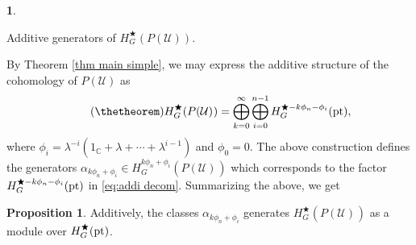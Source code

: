\documentclass[a4paper,leqno,11pt]{amsart}
\theoremstyle{plain}
\theoremstyle{definition}
\newtheorem{prop}[theorem]{Proposition}
\newtheorem{subsec}[theorem]{}
\theoremstyle{remark}
\theoremstyle{definition}
\newcommand{\C}{{\mathbb C}}
\newenvironment{myeq}[1][]
{\stepcounter{theorem}\begin{equation}\tag{\thetheorem}{#1}}
	{\end{equation}}
\newenvironment{mysubsection}[2][]
{\begin{subsec}\begin{upshape}\begin{bfseries}{#2.}
			\end{bfseries}{#1}}
		{\end{upshape}\end{subsec}}
\def\sU{\mathcal{U}}
\def\C{\mathbb{C}}
\numberwithin{equation}{section}
\newcommand{\pt}{\textup{pt}}
\begin{document}
	\begin{mysubsection}{Additive generators of $H^{\bigstar}_{G}(P(\mathcal{U}))$}
By Theorem \ref{thm main simple}, we may express the additive structure of the cohomology of $P(\sU)$  as
		\begin{myeq}\label{eq:addi decom}
			H^{\bigstar}_{G}(P(\sU)_{}) = \bigoplus ^{\infty}_{k=0}\bigoplus ^{n-1}_{i=0} H^{\bigstar - k\phi_n - \phi_i}_G(\pt),
		\end{myeq}
		where $ \phi_i=\lambda^{-i}(1_\C+\lambda+\cdots+\lambda^{i-1}) $ and $ \phi_0=0 $. The above construction  defines the  generators $ \alpha_{k\phi_n+\phi_i} \in H^{k\phi_n+\phi_i}_{G}(P(\sU)_{})$ which corresponds to the factor $ H^{\bigstar - k\phi_n - \phi_i}_G(\pt) $ in \eqref{eq:addi decom}.  Summarizing the above, we get
		\begin{prop}
			Additively, the classes $ \alpha_{k\phi_n+\phi_i}$ generates $  	H^{\bigstar}_{G}(P(\sU)_{})$   as a module over $H^{\bigstar}_{G}(\pt)$.
		\end{prop}
	\end{mysubsection}
	
\end{document}
